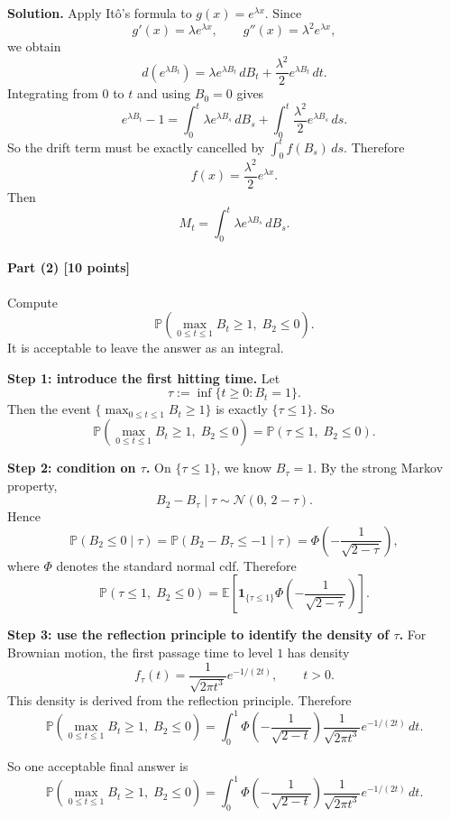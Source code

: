 \documentclass[11pt]{article}
\theoremstyle{definition}
\begin{document}
\textbf{Solution.}
Apply It\^o's formula to \(g(x)=e^{\lambda x}\). Since
\[
g'(x)=\lambda e^{\lambda x},
\qquad
g''(x)=\lambda^2 e^{\lambda x},
\]
we obtain
\[
d(e^{\lambda B_t})
=
\lambda e^{\lambda B_t}\,dB_t
+
\frac{\lambda^2}{2}e^{\lambda B_t}\,dt.
\]
Integrating from \(0\) to \(t\) and using \(B_0=0\) gives
\[
e^{\lambda B_t}-1
=
\int_0^t \lambda e^{\lambda B_s}\,dB_s
+
\int_0^t \frac{\lambda^2}{2}e^{\lambda B_s}\,ds.
\]
So the drift term must be exactly cancelled by \(\int_0^t f(B_s)\,ds\). Therefore
\[
\boxed{f(x)=\frac{\lambda^2}{2}e^{\lambda x}.}
\]
Then
\[
\boxed{
M_t
=
\int_0^t \lambda e^{\lambda B_s}\,dB_s.
}
\]

\paragraph{Part (2) \hfill [10 points]}
Compute
\[
\mathbb P\!\left(\max_{0\le t\le 1} B_t\ge 1,\; B_2\le 0\right).
\]
It is acceptable to leave the answer as an integral.

\textbf{Step 1: introduce the first hitting time.}
Let
\[
\tau:=\inf\{t\ge 0:B_t=1\}.
\]
Then the event \(\{\max_{0\le t\le 1}B_t\ge 1\}\) is exactly \(\{\tau\le 1\}\). So
\[
\mathbb P\!\left(\max_{0\le t\le 1} B_t\ge 1,\; B_2\le 0\right)
=
\mathbb P(\tau\le 1,\; B_2\le 0).
\]

\textbf{Step 2: condition on \(\tau\).}
On \(\{\tau\le 1\}\), we know \(B_\tau=1\). By the strong Markov property,
\[
B_2-B_\tau
\mid \tau
\sim \mathcal N(0,\,2-\tau).
\]
Hence
\[
\mathbb P(B_2\le 0\mid \tau)
=
\mathbb P(B_2-B_\tau\le -1\mid \tau)
=
\Phi\!\left(-\frac{1}{\sqrt{2-\tau}}\right),
\]
where \(\Phi\) denotes the standard normal cdf. Therefore
\[
\mathbb P(\tau\le 1,\; B_2\le 0)
=
\mathbb E\!\left[
\mathbf 1_{\{\tau\le 1\}}
\Phi\!\left(-\frac{1}{\sqrt{2-\tau}}\right)
\right].
\]

\textbf{Step 3: use the reflection principle to identify the density of \(\tau\).}
For Brownian motion, the first passage time to level \(1\) has density
\[
f_\tau(t)=\frac{1}{\sqrt{2\pi t^3}}e^{-1/(2t)},
\qquad t>0.
\]
This density is derived from the reflection principle. Therefore
\[
\mathbb P\!\left(\max_{0\le t\le 1} B_t\ge 1,\; B_2\le 0\right)
=
\int_0^1
\Phi\!\left(-\frac{1}{\sqrt{2-t}}\right)
\frac{1}{\sqrt{2\pi t^3}}e^{-1/(2t)}\,dt.
\]

So one acceptable final answer is
\[
\boxed{
\mathbb P\!\left(\max_{0\le t\le 1} B_t\ge 1,\; B_2\le 0\right)
=
\int_0^1
\Phi\!\left(-\frac{1}{\sqrt{2-t}}\right)
\frac{1}{\sqrt{2\pi t^3}}e^{-1/(2t)}\,dt.
}
\]
\end{document}
